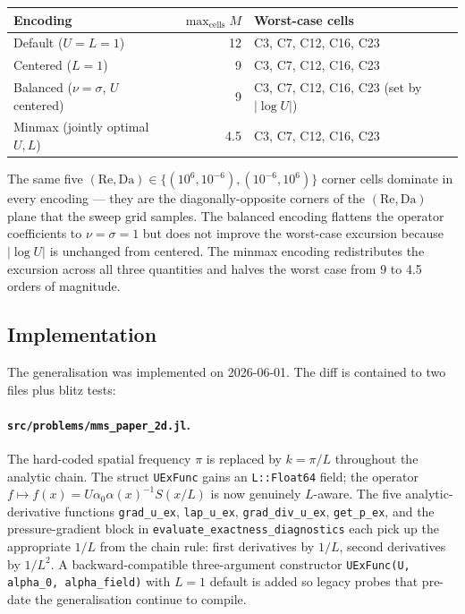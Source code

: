 \documentclass[11pt]{article}
\newcommand{\code}[1]{\texttt{#1}}
\begin{document}
\begin{center}
\begin{tabular}{lrl}
  \toprule
  Encoding & $\max_{\text{cells}} M$ & Worst-case cells \\
  \midrule
  Default ($U = L = 1$)             & 12  & C3, C7, C12, C16, C23 \\
  Centered ($L = 1$)                & 9   & C3, C7, C12, C16, C23 \\
  Balanced ($\nu = \sigma$, $U$ centered) & 9 & C3, C7, C12, C16, C23 (set by $|\log U|$) \\
  Minmax (jointly optimal $U, L$)   & 4.5 & C3, C7, C12, C16, C23 \\
  \bottomrule
\end{tabular}
\end{center}

\noindent The same five $(\mathrm{Re}, \mathrm{Da}) \in
\{(10^{6}, 10^{-6}), (10^{-6}, 10^{6})\}$ corner cells dominate in
every encoding — they are the diagonally-opposite corners of the
$(\mathrm{Re}, \mathrm{Da})$ plane that the sweep grid samples. The
balanced encoding flattens the operator coefficients to
$\nu = \sigma = 1$ but does not improve the worst-case excursion
because $|\log U|$ is unchanged from centered. The minmax encoding
redistributes the excursion across all three quantities and halves
the worst case from 9 to 4.5 orders of magnitude.

\subsection{Implementation}
\label{sec:varL-impl}

The generalisation was implemented on 2026-06-01. The diff is contained
to two files plus blitz tests:

\paragraph{\texttt{src/problems/mms\_paper\_2d.jl}.}  The hard-coded
spatial frequency $\pi$ is replaced by $k = \pi / L$ throughout the
analytic chain. The struct \code{UExFunc} gains an
\code{L::Float64} field; the operator
$f \mapsto f(x) = U \alpha_0 \alpha(x)^{-1} S(x/L)$ is now genuinely
$L$-aware. The five analytic-derivative functions
\code{grad\_u\_ex}, \code{lap\_u\_ex}, \code{grad\_div\_u\_ex},
\code{get\_p\_ex}, and the pressure-gradient block in
\code{evaluate\_exactness\_diagnostics} each pick up the appropriate
$1/L$ from the chain rule: first derivatives by $1/L$, second
derivatives by $1/L^2$. A backward-compatible three-argument constructor
\code{UExFunc(U, alpha\_0, alpha\_field)} with $L = 1$ default is added
so legacy probes that pre-date the generalisation continue to compile.
\end{document}
